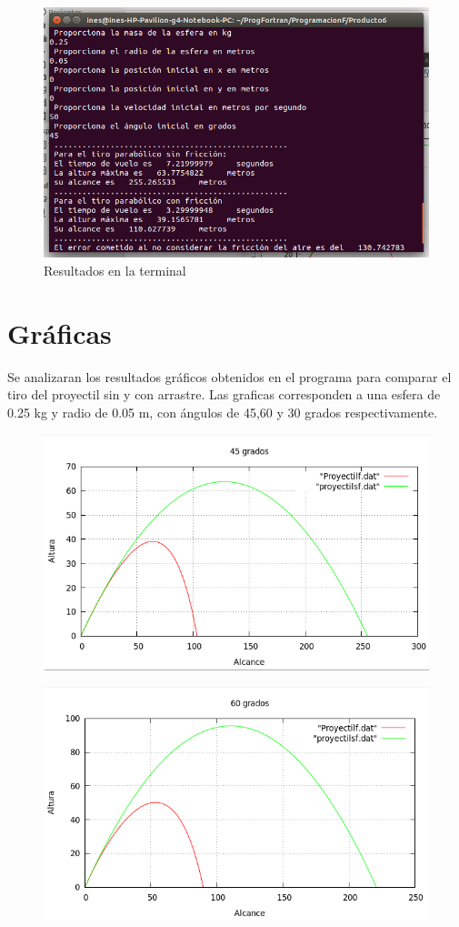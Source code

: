 \documentclass[a4paper]{article}
\begin{document}
\begin{figure}[h]
\centering
\includegraphics[width=10 cm]{terminal.png}
\caption{\label{fig:terminal}Resultados en la terminal}
\end{figure}

\section{Gráficas}

Se analizaran los resultados gráficos obtenidos en el programa para comparar el tiro del proyectil sin y con arrastre. Las graficas corresponden a una esfera de 0.25 kg y radio de 0.05 m, con ángulos de 45,60 y 30 grados respectivamente.

\begin{figure}[ht]
\centering
\includegraphics[width=10 cm]{45.png}
\end{figure}

\begin{figure}[ht]
\centering
\includegraphics[width=10 cm]{60.png}
\end{figure}
\end{document}
